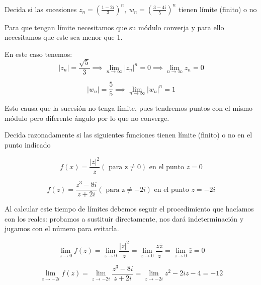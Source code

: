 \begin{problem}[3]
Decida si las sucesiones $z_n= \left(\frac{1-2i}{3}\right)^n, \ w_n = \left( \frac{3-4i}{5}\right)^n$ tienen límite (finito) o no

\solution
Para que tengan límite necesitamos que su módulo converja y para ello necesitamos que este sea menor que 1.

En este caso tenemos:
\[|z_n| = \frac{\sqrt{5}}{3} \implies \lim_{n \to \infty} |z_n|^n = 0 \implies \lim_{n\to\infty} z_n = 0\]

\[|w_n| = \frac{5}{5} \implies \lim_{n \to \infty} |w_n|^n = 1\]

Esto causa que la sucesión no tenga límite, pues tendremos puntos con el mismo módulo pero diferente ángulo por lo que no converge.

\end{problem}

\begin{problem}[4]
Decida razonadamente si las siguientes funciones tienen límite (finito) o no en el punto indicado

\ppart
\[f(x) = \frac{|z|^2}{z} (\text{ para z}\neq0 )\text{ en el punto } z=0\]

\ppart
\[f(z)= \frac{z^3-8i}{z+2i} ( \text{ para z} \neq -2i) \text{ en el punto } z=-2i\]

\solution

Al calcular este tiempo de límites debemos seguir el procedimiento que hacíamos con los reales: probamos a sustituir directamente, nos dará indeterminación y jugamos con el número para evitarla.

\spart
\[\lim_{z \to 0} f(z) = \lim_{z \to 0} \frac{|z|^2}{z} = \lim_{z \to 0}\frac{z \bar{z}}{z}=\lim_{z \to 0} \bar{z} = 0\]

\spart

\[\lim_{z \to -2i} f(z) = \lim_{z \to -2i} \frac{z^3-8i}{z+2i} = \lim_{z \to -2i} z^2-2iz-4 = -12\]
\end{problem}

